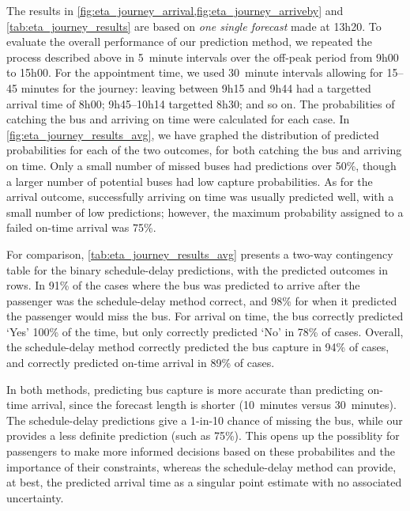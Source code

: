 The results in \cref{fig:eta_journey_arrival,fig:eta_journey_arriveby} and \cref{tab:eta_journey_results} are based on \emph{one single forecast} made at 13h20. To evaluate the overall performance of our prediction method, we repeated the process described above in 5~minute intervals over the off-peak period from  9h00 to 15h00. For the appointment time, we used 30~minute intervals allowing for 15--45 minutes for the journey: leaving between 9h15 and 9h44 had a targetted arrival time of 8h00; 9h45--10h14 targetted 8h30; and so on. The probabilities of catching the bus and arriving on time were calculated for each case. In \cref{fig:eta_journey_results_avg}, we have graphed the distribution of predicted probabilities for each of the two outcomes, for both catching the bus and arriving on time. Only a small number of missed buses had predictions over 50\%, though a larger number of potential buses had low capture probabilities. As for the arrival outcome, successfully arriving on time was usually predicted well, with a small number of low predictions; however, the maximum probability assigned to a failed on-time arrival was 75\%.



For comparison, \cref{tab:eta_journey_results_avg} presents a two-way contingency table for the binary schedule-delay predictions, with the predicted outcomes in rows. In 91\% of the cases where the bus was predicted to arrive after the passenger was the schedule-delay method correct, and 98\% for when it predicted the passenger would miss the bus. For arrival on time, the bus correctly predicted `Yes' 100\% of the time, but only correctly predicted `No' in 78\% of cases. Overall, the schedule-delay method correctly predicted the bus capture in 94\% of cases, and correctly predicted on-time arrival in 89\% of cases.


In both methods, predicting bus capture is more accurate than predicting on-time arrival, since the forecast length is shorter (10~minutes versus 30~minutes). The schedule-delay predictions give a 1-in-10 chance of missing the bus, while our \pf{} provides a less definite prediction (such as 75\%). This opens up the possiblity for passengers to make more informed decisions based on these probabilites and the importance of their constraints, whereas the schedule-delay method can provide, at best, the predicted arrival time as a singular point estimate with no associated uncertainty.





